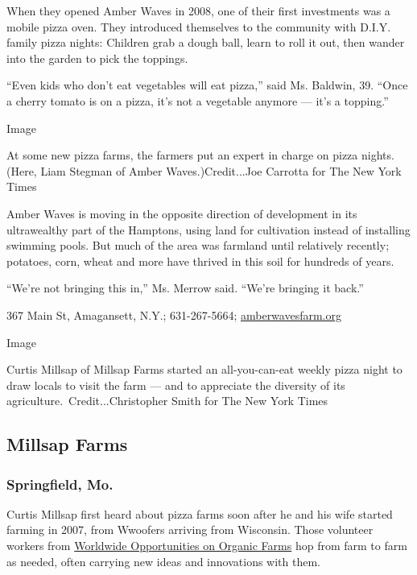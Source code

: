 When they opened Amber Waves in 2008, one of their first investments was
a mobile pizza oven. They introduced themselves to the community with
D.I.Y. family pizza nights: Children grab a dough ball, learn to roll it
out, then wander into the garden to pick the toppings.

``Even kids who don't eat vegetables will eat pizza,'' said Ms. Baldwin,
39. ``Once a cherry tomato is on a pizza, it's not a vegetable anymore
--- it's a topping.''

Image

At some new pizza farms, the farmers put an expert in charge on pizza
nights. (Here, Liam Stegman of Amber Waves.)Credit...Joe Carrotta for
The New York Times

Amber Waves is moving in the opposite direction of development in its
ultrawealthy part of the Hamptons, using land for cultivation instead of
installing swimming pools. But much of the area was farmland until
relatively recently; potatoes, corn, wheat and more have thrived in this
soil for hundreds of years.

``We're not bringing this in,'' Ms. Merrow said. ``We're bringing it
back.''

367 Main St, Amagansett, N.Y.; 631-267-5664;
\href{https://www.amberwavesfarm.org/}{amberwavesfarm.org}

Image

Curtis Millsap of Millsap Farms started an all-you-can-eat weekly pizza
night to draw locals to visit the farm --- and to appreciate the
diversity of its agriculture.~Credit...Christopher Smith for The New
York Times

\hypertarget{millsap-farms}{%
\subsection{Millsap Farms}\label{millsap-farms}}

\hypertarget{springfield-mo}{%
\subsubsection{Springfield, Mo.}\label{springfield-mo}}

Curtis Millsap first heard about pizza farms soon after he and his wife
started farming in 2007, from Wwoofers arriving from Wisconsin. Those
volunteer workers from
\href{https://wwoofusa.org/?gclid=EAIaIQobChMImPqDu5Cq6wIVCACGCh30LQTkEAAYASAAEgJnvPD_BwE}{Worldwide
Opportunities on Organic Farms} hop from farm to farm as needed, often
carrying new ideas and innovations with them.

